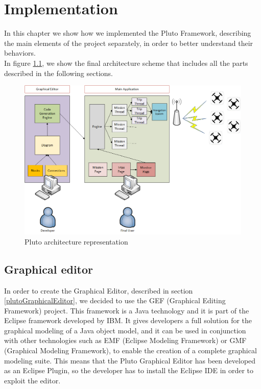 \chapter{Implementation}
\label{cap5}

In this chapter we show how we implemented the Pluto Framework, describing the main elements of the project separately, in order to better understand their behaviors.
\\
In figure \ref{fig:finalArchitecture}, we show the final architecture scheme that includes all the parts described in the following sections.

 \begin{figure}[h!]
 \centering
 \includegraphics[width=\linewidth]
 {pictures/Final_Architecture.png}
 \caption{Pluto architecture representation}
 \label{fig:finalArchitecture}
 \end{figure}

\section{Graphical editor}\label{editor}

In order to create the Graphical Editor, described in section \ref{plutoGraphicalEditor}, we decided to use the GEF (Graphical Editing Framework) project. This framework is a Java technology and it is part of the Eclipse framework developed by IBM.
It gives developers a full solution for the  graphical modeling of a Java object model, and it can be used in conjunction with other technologies such as EMF (Eclipse Modeling Framework) or GMF (Graphical Modeling Framework), to enable the creation of a complete graphical modeling suite. 
This means that the Pluto Graphical Editor has been developed as an Eclipse Plugin, so the developer has to install the Eclipse IDE in order to exploit the editor.
\\

